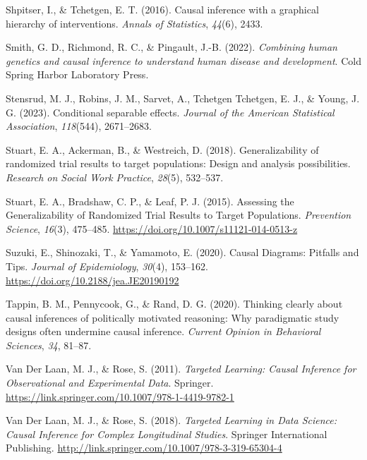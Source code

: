 \documentclass[
  single column]{article}
\newlength{\cslhangindent}
\newenvironment{CSLReferences}[2] %
 {\begin{list}{}{%
  \setlength{\itemindent}{0pt}
  \setlength{\leftmargin}{0pt}
  \setlength{\parsep}{0pt}
  \ifodd #1
   \setlength{\leftmargin}{\cslhangindent}
   \setlength{\itemindent}{-1\cslhangindent}
  \fi
  \setlength{\itemsep}{#2\baselineskip}}}
 {\end{list}}
\begin{document}
\begin{CSLReferences}{1}{0}
Shpitser, I., \& Tchetgen, E. T. (2016). Causal inference with a
graphical hierarchy of interventions. \emph{Annals of Statistics},
\emph{44}(6), 2433.

Smith, G. D., Richmond, R. C., \& Pingault, J.-B. (2022).
\emph{Combining human genetics and causal inference to understand human
disease and development}. Cold Spring Harbor Laboratory Press.

Stensrud, M. J., Robins, J. M., Sarvet, A., Tchetgen Tchetgen, E. J., \&
Young, J. G. (2023). Conditional separable effects. \emph{Journal of the
American Statistical Association}, \emph{118}(544), 2671--2683.

Stuart, E. A., Ackerman, B., \& Westreich, D. (2018). Generalizability
of randomized trial results to target populations: Design and analysis
possibilities. \emph{Research on Social Work Practice}, \emph{28}(5),
532--537.

Stuart, E. A., Bradshaw, C. P., \& Leaf, P. J. (2015). Assessing the
Generalizability of Randomized Trial Results to Target Populations.
\emph{Prevention Science}, \emph{16}(3), 475--485.
\url{https://doi.org/10.1007/s11121-014-0513-z}

Suzuki, E., Shinozaki, T., \& Yamamoto, E. (2020). Causal Diagrams:
Pitfalls and Tips. \emph{Journal of Epidemiology}, \emph{30}(4),
153--162. \url{https://doi.org/10.2188/jea.JE20190192}

Tappin, B. M., Pennycook, G., \& Rand, D. G. (2020). Thinking clearly
about causal inferences of politically motivated reasoning: Why
paradigmatic study designs often undermine causal inference.
\emph{Current Opinion in Behavioral Sciences}, \emph{34}, 81--87.

Van Der Laan, M. J., \& Rose, S. (2011). \emph{Targeted Learning: Causal
Inference for Observational and Experimental Data}. Springer.
\url{https://link.springer.com/10.1007/978-1-4419-9782-1}

Van Der Laan, M. J., \& Rose, S. (2018). \emph{Targeted Learning in Data
Science: Causal Inference for Complex Longitudinal Studies}. Springer
International Publishing.
\url{http://link.springer.com/10.1007/978-3-319-65304-4}


\end{CSLReferences}
\end{document}
